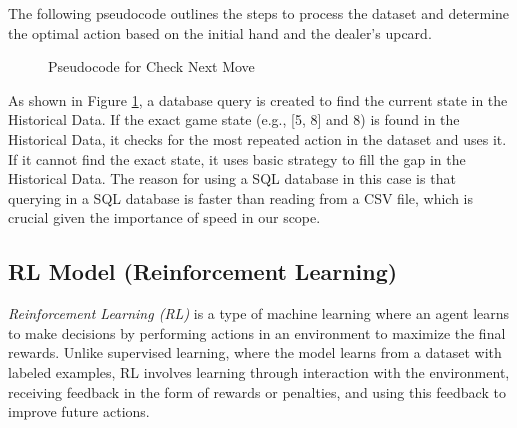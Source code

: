 \documentclass[a4paper,12pt]{report}
\begin{document}
The following pseudocode outlines the steps to process the dataset and determine the optimal action based on the initial hand and the dealer's upcard.

\begin{figure}[H]
\caption{Pseudocode for Check Next Move}
\label{alg:historical_data}
\end{figure}

As shown in Figure \ref{alg:historical_data}, a database query is created to find the current state in the Historical Data. If the exact game state (e.g., [5, 8] and 8) is found in the Historical Data, it checks for the most repeated action in the dataset and uses it. If it cannot find the exact state, it uses basic strategy to fill the gap in the Historical Data. The reason for using a SQL database in this case is that querying in a SQL database is faster than reading from a CSV file, which is crucial given the importance of speed in our scope.

\subsection{RL Model (Reinforcement Learning)}
\label{RL}
\textit{Reinforcement Learning (RL)} is a type of machine learning where an agent learns to make decisions by performing actions in an environment to maximize the final rewards. Unlike supervised learning, where the model learns from a dataset with labeled examples, RL involves learning through interaction with the environment, receiving feedback in the form of rewards or penalties, and using this feedback to improve future actions.
\end{document}
